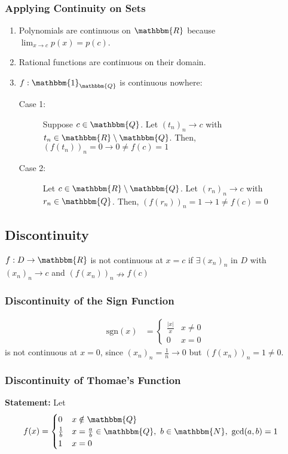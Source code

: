 \documentclass[10pt]{extarticle}
\newcommand{\N}{\mathbbm{N}}
\newcommand{\Q}{\mathbbm{Q}}
\newcommand{\R}{\mathbbm{R}}
\begin{document}
    \subsubsection{Applying Continuity on Sets}%
    \begin{enumerate}[(1)]
      \item Polynomials are continuous on $\R$ because $\lim_{x\rightarrow c}p(x) = p(c)$.
      \item Rational functions are continuous on their domain.
      \item $f: \mathbbm{1}_{\Q}$ is continuous nowhere:
        \begin{description}
          \item[Case 1:] Suppose $c \in \Q$. Let $(t_n)_n \rightarrow c$ with $t_n \in \R\setminus \Q$. Then, $(f(t_n))_n = 0 \rightarrow 0 \neq f(c) = 1$
          \item[Case 2:] Let $c\in \R \setminus \Q$. Let $(r_n)_n \rightarrow c$ with $r_n \in \Q$. Then, $(f(r_n))_n = 1 \rightarrow 1 \neq f(c) = 0$
        \end{description}
    \end{enumerate}
  \subsection{Discontinuity}%
    $f: D\rightarrow \R$ is not continuous at $x = c$ if $\exists (x_n)_n$ in $D$ with $(x_n)_n \rightarrow c$ and $(f(x_n))_n \nrightarrow f(c)$
    \subsubsection{Discontinuity of the Sign Function}%
    \begin{align*}
      \text{sgn}(x) &= \begin{cases}
        \frac{|x|}{x} & x\neq 0\\
        0 & x = 0
      \end{cases}
    \end{align*}
    is not continuous at $x = 0$, since $(x_n)_n = \frac{1}{n} \rightarrow 0$ but $(f(x_n))_n = 1 \neq 0$.
    \subsubsection{Discontinuity of Thomae's Function}%
    \textbf{Statement:} Let
    \begin{align*}
      f(x) &= \begin{cases}
        0 & x\notin \Q\\
        \frac{1}{b} & x = \frac{a}{b}\in\Q,~b\in\N,~\text{gcd}(a,b)=1\\
        1 & x = 0
      \end{cases}
    \end{align*}
\end{document}
